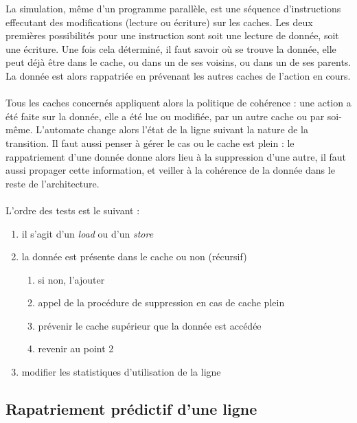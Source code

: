 La simulation, même d'un programme parallèle, est une séquence d'instructions effecutant des modifications (lecture ou écriture) sur les caches. Les deux premières possibilités pour une instruction sont soit une lecture de donnée, soit une écriture. Une fois cela déterminé, il faut savoir où se trouve la donnée, elle peut déjà être dans le cache, ou dans un de ses voisins, ou dans un de ses parents. La donnée est alors rappatriée en prévenant les autres caches de l'action en cours. 

\paragraph{}
Tous les caches concernés appliquent alors la politique de cohérence : une action a été faite sur la donnée, elle a été lue ou modifiée, par un autre cache ou par soi-même. L'automate change alors l'état de la ligne suivant la nature de la transition. Il faut aussi penser à gérer le cas ou le cache est plein : le rappatriement d'une donnée donne alors lieu à la suppression d'une autre, il faut aussi propager cette information, et veiller à la cohérence de la donnée dans le reste de l'architecture.

\paragraph{}
L'ordre des tests est le suivant : 
\begin{enumerate}
  \item{il s'agit d'un \emph{load} ou d'un \emph{store}}
  \item{la donnée est présente dans le cache ou non (récursif)
    \begin{enumerate}
      \item{si non, l'ajouter}
      \item{appel de la procédure de suppression en cas de cache plein}
      \item{prévenir le cache supérieur que la donnée est accédée}
      \item{revenir au point 2}
  \end{enumerate}}
  \item{modifier les statistiques d'utilisation de la ligne}
\end{enumerate}

\subsection{Rapatriement prédictif d'une ligne}

